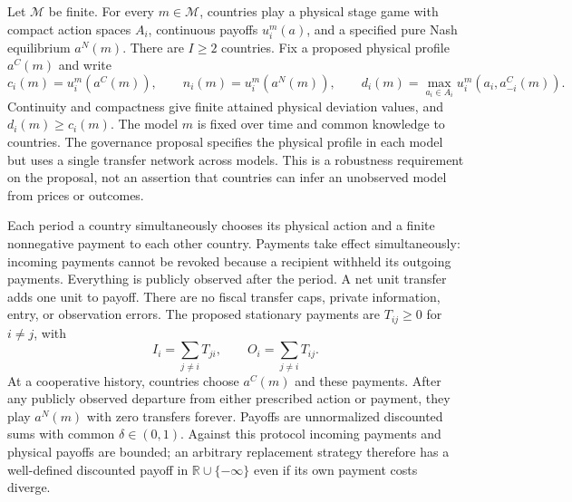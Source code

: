 \documentclass[11pt]{article}
\theoremstyle{definition}
\begin{document}
Let $\mathcal M$ be finite. For every $m\in\mathcal M$, countries play a
physical stage game with compact action spaces $A_i$, continuous payoffs
$u_i^m(a)$, and a specified pure Nash equilibrium $a^N(m)$. There are
$I\geq2$ countries. Fix a proposed physical profile $a^C(m)$ and write
\[
 c_i(m)=u_i^m(a^C(m)),\qquad n_i(m)=u_i^m(a^N(m)),\qquad
 d_i(m)=\max_{a_i\in A_i}u_i^m(a_i,a^C_{-i}(m)).
\]
Continuity and compactness give finite attained physical deviation values,
and $d_i(m)\geq c_i(m)$. The model $m$ is fixed over time and common
knowledge to countries. The governance proposal specifies the physical
profile in each model but uses a single transfer network across models.
This is a robustness requirement on the proposal, not an assertion that
countries can infer an unobserved model from prices or outcomes.

Each period a country simultaneously chooses its physical action and a
finite nonnegative payment to each other country. Payments take effect
simultaneously: incoming payments cannot be revoked because a recipient
withheld its outgoing payments. Everything is publicly observed after the
period. A net unit transfer adds one unit to payoff. There are no fiscal
transfer caps, private information, entry, or observation errors. The
proposed stationary payments are $T_{ij}\geq0$ for $i\ne j$, with
\[
 I_i=\sum_{j\ne i}T_{ji},\qquad O_i=\sum_{j\ne i}T_{ij}.
\]
At a cooperative history, countries choose $a^C(m)$ and these payments.
After any publicly observed departure from either prescribed action or
payment, they play $a^N(m)$ with zero transfers forever. Payoffs are
unnormalized discounted sums with common $\delta\in(0,1)$. Against this
protocol incoming payments and physical payoffs are bounded; an arbitrary
replacement strategy therefore has a well-defined discounted payoff in
$\mathbb R\cup\{-\infty\}$ even if its own payment costs diverge.
\end{document}
